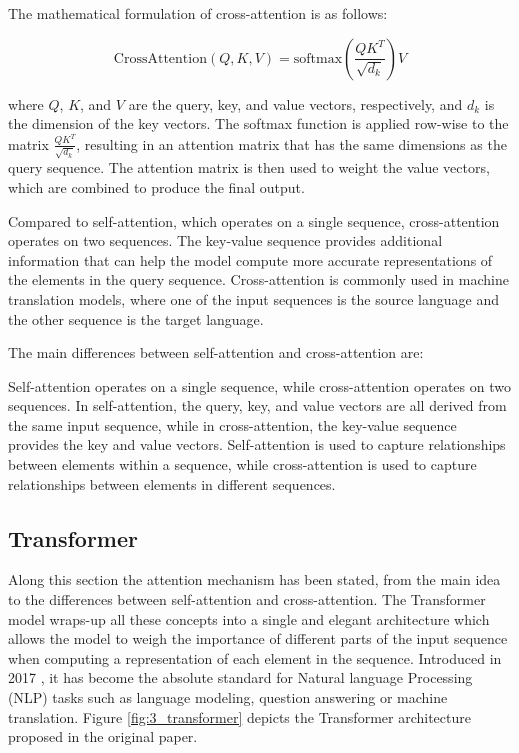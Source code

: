 The mathematical formulation of cross-attention is as follows:

\begin{equation}
	\text{CrossAttention}(Q, K, V) = \text{softmax}\left(\frac{QK^T}{\sqrt{d_k}}\right)V
\end{equation}

where $Q$, $K$, and $V$ are the query, key, and value vectors, respectively, and $d_k$ is the dimension of the key vectors. The softmax function is applied row-wise to the matrix $\frac{QK^T}{\sqrt{d_k}}$, resulting in an attention matrix that has the same dimensions as the query sequence. The attention matrix is then used to weight the value vectors, which are combined to produce the final output.

Compared to self-attention, which operates on a single sequence, cross-attention operates on two sequences. The key-value sequence provides additional information that can help the model compute more accurate representations of the elements in the query sequence. Cross-attention is commonly used in machine translation models, where one of the input sequences is the source language and the other sequence is the target language.

The main differences between self-attention and cross-attention are:

Self-attention operates on a single sequence, while cross-attention operates on two sequences.
In self-attention, the query, key, and value vectors are all derived from the same input sequence, while in cross-attention, the key-value sequence provides the key and value vectors.
Self-attention is used to capture relationships between elements within a sequence, while cross-attention is used to capture relationships between elements in different sequences.

\subsection{Transformer}
\label{subsec:3_transformer}


Along this section the attention mechanism has been stated, from the main idea to the differences between self-attention and cross-attention. The Transformer model wraps-up all these concepts into a single and elegant architecture which allows the model to weigh the importance of different parts of the input sequence when computing a representation of each element in the sequence. Introduced in 2017 \cite{vaswani2017attention}, it has become the absolute standard for Natural language Processing (NLP) tasks such as language modeling, question answering or machine translation. Figure \ref{fig:3_transformer} depicts the Transformer architecture proposed in the original paper.

